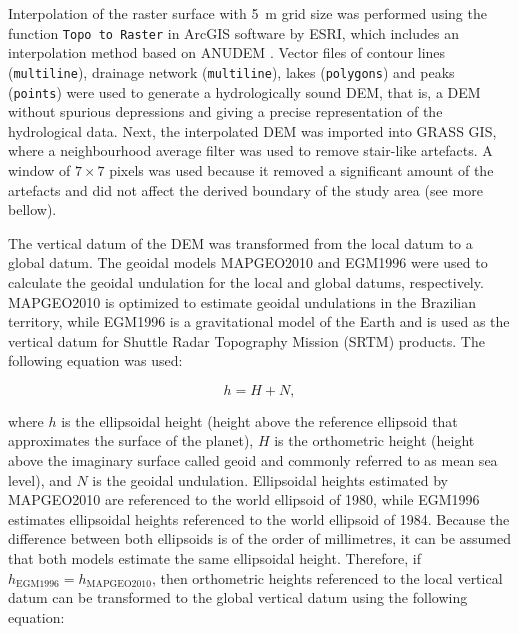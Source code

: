 
Interpolation of the raster surface with \SI{5}{\metre} grid size was performed using the function 
\texttt{Topo to Raster} in ArcGIS\rr{} software by ESRI, which includes an interpolation method 
based on ANUDEM \cite{Hutchinson1989}. Vector files of contour lines (\texttt{multiline}), 
drainage network (\texttt{multiline}), lakes (\texttt{polygons}) and peaks (\texttt{points}) were used to 
generate a hydrologically sound DEM, that is, a DEM without spurious depressions and giving a precise 
representation of the hydrological data. Next, the interpolated DEM was imported into GRASS GIS, where a 
neighbourhood average filter was used to remove stair-like artefacts. A window of $7 \times 7$ pixels was used 
because it removed a significant amount of the artefacts and did not affect the derived boundary of the study 
area (see more bellow).

The vertical datum of the DEM was transformed from the local datum to a global datum. The geoidal models 
MAPGEO2010 \cite{IBGE2010a} and EGM1996 \cite{LemoineEtAl1998} were used to calculate the geoidal undulation 
for the local and global datums, respectively. MAPGEO2010 is optimized to estimate geoidal undulations in the 
Brazilian territory, while EGM1996 is a gravitational model of the Earth and is used as the vertical datum for 
Shuttle Radar Topography Mission (SRTM) products. The following equation was used:

\begin{equation}\label{eqn:geoidal}
 h = H + N,
\end{equation}

\noindent where $h$ is the ellipsoidal height (height above the reference ellipsoid that approximates the 
surface of the planet), $H$ is the orthometric height (height above the imaginary surface called geoid and 
commonly referred to as mean sea level), and $N$ is the geoidal undulation. Ellipsoidal heights estimated by 
MAPGEO2010 are referenced to the world ellipsoid of 1980, while EGM1996 estimates ellipsoidal heights 
referenced to the world ellipsoid of 1984. Because the difference between both ellipsoids is of the order of 
millimetres, it can be assumed that both models estimate the same ellipsoidal height. Therefore, if 
$h_{\text{EGM1996}} = h_{\text{MAPGEO2010}}$, then orthometric heights referenced to the local vertical datum 
can be transformed to the global vertical datum using the following equation:

